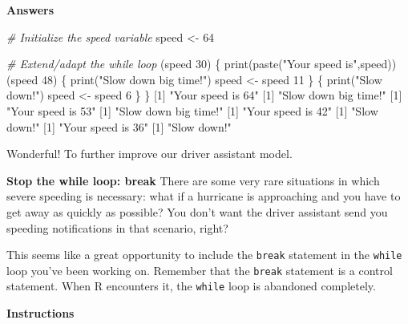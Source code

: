 \documentclass[]{article}
\newcommand{\hlnum}[1]{\textcolor[rgb]{0.816,0.125,0.439}{#1}}%
\newcommand{\hlstr}[1]{\textcolor[rgb]{0.251,0.627,0.251}{#1}}%
\newcommand{\hlcom}[1]{\textcolor[rgb]{0.502,0.502,0.502}{\textit{#1}}}%
\newcommand{\hlstd}[1]{\textcolor[rgb]{0.251,0.251,0.251}{#1}}%
\newcommand{\hlkwd}[1]{\textcolor[rgb]{0.878,0.439,0.125}{#1}}%
\newenvironment{Shaded}{\begin{myshaded}}{\end{myshaded}}
\newcommand{\KeywordTok}[1]{\hlkwd{#1}}
\newcommand{\DecValTok}[1]{\hlnum{#1}}
\newcommand{\StringTok}[1]{\hlstr{#1}}
\newcommand{\CommentTok}[1]{\hlcom{#1}}
\newcommand{\NormalTok}[1]{\hlstd{#1}}
\begin{document}
\textbf{Answers}

\begin{Shaded}
\begin{Highlighting}[]
\CommentTok{# Initialize the speed variable}
\NormalTok{speed <-}\StringTok{ }\DecValTok{64}

\CommentTok{# Extend/adapt the while loop}
\NormalTok{ (speed }\OperatorTok{>}\StringTok{ }\DecValTok{30}\NormalTok{) \{}
\KeywordTok{print}\NormalTok{(}\KeywordTok{paste}\NormalTok{(}\StringTok{"Your speed is"}\NormalTok{,speed))}
\NormalTok{ (speed }\OperatorTok{>}\StringTok{ }\DecValTok{48}\NormalTok{) \{}
\KeywordTok{print}\NormalTok{(}\StringTok{"Slow down big time!"}\NormalTok{)    }
\NormalTok{speed <-}\StringTok{ }\NormalTok{speed }\OperatorTok{-}\StringTok{ }\DecValTok{11}    
\NormalTok{\} }\NormalTok{ \{}
\KeywordTok{print}\NormalTok{(}\StringTok{"Slow down!"}\NormalTok{)}
\NormalTok{speed <-}\StringTok{ }\NormalTok{speed }\OperatorTok{-}\StringTok{ }\DecValTok{6}
\NormalTok{\}}
\NormalTok{\}}
\NormalTok{   [}\DecValTok{1}\NormalTok{] }\StringTok{"Your speed is 64"}
\NormalTok{   [}\DecValTok{1}\NormalTok{] }\StringTok{"Slow down big time!"}
\NormalTok{   [}\DecValTok{1}\NormalTok{] }\StringTok{"Your speed is 53"}
\NormalTok{   [}\DecValTok{1}\NormalTok{] }\StringTok{"Slow down big time!"}
\NormalTok{   [}\DecValTok{1}\NormalTok{] }\StringTok{"Your speed is 42"}
\NormalTok{   [}\DecValTok{1}\NormalTok{] }\StringTok{"Slow down!"}
\NormalTok{   [}\DecValTok{1}\NormalTok{] }\StringTok{"Your speed is 36"}
\NormalTok{   [}\DecValTok{1}\NormalTok{] }\StringTok{"Slow down!"}
\end{Highlighting}
\end{Shaded}

Wonderful! To further improve our driver assistant model.

\textbf{Stop the while loop: break} There are some very rare situations
in which severe speeding is necessary: what if a hurricane is
approaching and you have to get away as quickly as possible? You don't
want the driver assistant send you speeding notifications in that
scenario, right?

This seems like a great opportunity to include the \texttt{break}
statement in the \texttt{while} loop you've been working on. Remember
that the \texttt{break} statement is a control statement. When R
encounters it, the \texttt{while} loop is abandoned completely.

\textbf{Instructions}
\end{document}
